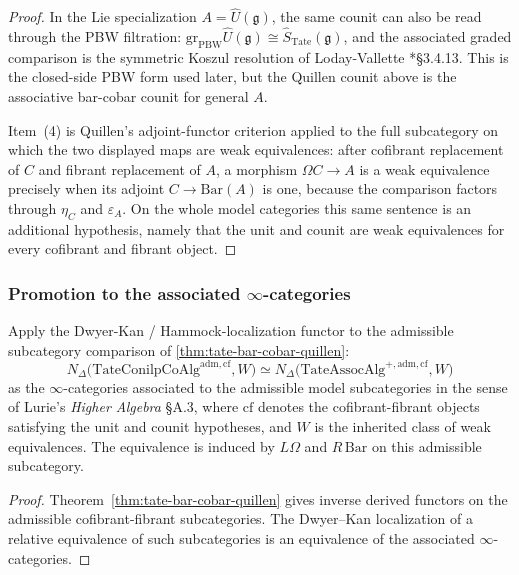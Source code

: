\begin{proof}
  In the Lie specialization \(A=\widehat U(\mathfrak g)\), the same
  counit can also be read through the PBW filtration:
  \(\mathrm{gr}_{\mathrm{PBW}}\widehat U(\mathfrak g)\cong
  \widehat S_{\mathrm{Tate}}(\mathfrak g)\), and the associated graded
  comparison is the symmetric Koszul resolution of
  Loday-Vallette \cite{loday-vallette}*{\S 3.4.13}.  This is the
  closed-side PBW form used later, but the Quillen counit above is the
  associative bar-cobar counit for general \(A\).

  Item~(4) is Quillen's adjoint-functor criterion applied to the full
  subcategory on which the two displayed maps are weak equivalences:
  after cofibrant replacement of \(C\) and fibrant replacement of \(A\),
  a morphism \(\Omega C\to A\) is a weak equivalence precisely when its
  adjoint \(C\to\mathrm{Bar}(A)\) is one, because the comparison factors
  through \(\eta_C\) and \(\varepsilon_A\).  On the whole model
  categories this same sentence is an additional hypothesis, namely
  that the unit and counit are weak equivalences for every cofibrant and
  fibrant object.
\end{proof}

\subsubsection[Promotion to the associated infinity-categories]{Promotion to the associated $\infty$-categories}

\begin{cor}
  \label{cor:tate-bar-cobar-infinity}
  Apply the Dwyer-Kan / Hammock-localization functor to the
  admissible subcategory comparison of \ref{thm:tate-bar-cobar-quillen}:
  $$N_\Delta\bigl(\mathrm{TateConilpCoAlg}^{\mathrm{adm,cf}},W\bigr)
    \simeq
    N_\Delta\bigl(\mathrm{TateAssocAlg}^{+,\mathrm{adm,cf}},W\bigr)$$
  as the $\infty$-categories associated to the admissible model
  subcategories in the sense of Lurie's
  \emph{Higher Algebra} \S A.3, where $\mathrm{cf}$ denotes the
  cofibrant-fibrant objects satisfying the unit and counit
  hypotheses, and \(W\) is the inherited class of weak equivalences.
  The equivalence is induced by \(L\Omega\) and \(R\,\mathrm{Bar}\) on
  this admissible subcategory.
\end{cor}

\begin{proof}
  Theorem~\ref{thm:tate-bar-cobar-quillen} gives inverse derived
  functors on the admissible cofibrant-fibrant subcategories.  The
  Dwyer--Kan localization of a relative equivalence of such
  subcategories is an equivalence of the associated
  \(\infty\)-categories.
\end{proof}

